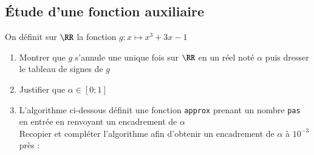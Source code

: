 \documentclass[oneside,12pt]{article}
\begin{document}
\subsection{Étude d'une fonction auxiliaire}
On définit sur $\RR$ la fonction $g:x\mapsto x^3+3x-1$
\begin{enumerate}
    \item Montrer que $g$ s'annule une unique fois sur $\RR$ en un réel noté $\alpha$ puis dresser le tableau de signes de $g$
    \item Justifier que $\alpha\in[0;1]$
    \item L'algorithme ci-dessous définit une fonction \texttt{approx} prenant un nombre \texttt{pas} en entrée en renvoyant un encadrement de $\alpha$\\
    Recopier et compléter l'algorithme afin d'obtenir un encadrement de $\alpha$ à $10^{-3}$ près :
    \begin{center}
    \end{center}
\end{enumerate}
\end{document}

